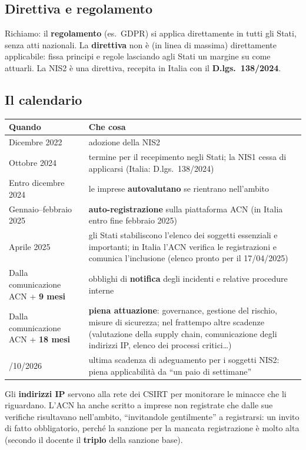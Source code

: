 \subsection{Direttiva e regolamento}
Richiamo: il \textbf{regolamento} (es.\ GDPR) si applica direttamente in tutti gli Stati, senza atti
nazionali. La \textbf{direttiva} non è (in linea di massima) direttamente applicabile: fissa principi e
regole lasciando agli Stati un margine su come attuarli. La NIS2 è una direttiva, recepita in Italia con
il \textbf{D.lgs.~138/2024}.

\subsection{Il calendario}
\begin{center}
\small
\begin{tabularx}{\linewidth}{>{\raggedright\arraybackslash}p{3.4cm} X}
\toprule
\textbf{Quando} & \textbf{Che cosa}\\
\midrule
Dicembre 2022 & adozione della NIS2\\
Ottobre 2024 & termine per il recepimento negli Stati; la NIS1 cessa di applicarsi (Italia:
  D.lgs.~138/2024)\\
Entro dicembre 2024 & le imprese \textbf{autovalutano} se rientrano nell'ambito\\
Gennaio--febbraio 2025 & \textbf{auto-registrazione} sulla piattaforma ACN (in Italia entro fine
  febbraio 2025)\\
Aprile 2025 & gli Stati stabiliscono l'elenco dei soggetti essenziali e importanti; in Italia l'ACN
  verifica le registrazioni e comunica l'inclusione (elenco pronto per il 17/04/2025)\\
Dalla comunicazione ACN + \textbf{9 mesi} & obblighi di \textbf{notifica} degli incidenti e relative
  procedure interne\\
Dalla comunicazione ACN + \textbf{18 mesi} & \textbf{piena attuazione}: governance, gestione del
  rischio, misure di sicurezza; nel frattempo altre scadenze (valutazione della supply chain,
  comunicazione degli indirizzi IP, elenco dei processi critici\ldots)\\
30/10/2026 & ultima scadenza di adeguamento per i soggetti NIS2: piena applicabilità da ``un paio di
  settimane''\\
\bottomrule
\end{tabularx}
\end{center}
Gli \textbf{indirizzi IP} servono alla rete dei CSIRT per monitorare le minacce che li riguardano. L'ACN
ha anche scritto a imprese non registrate che dalle sue verifiche risultavano nell'ambito, ``invitandole
gentilmente'' a registrarsi: un invito di fatto obbligatorio, perché la sanzione per la mancata
registrazione è molto alta (secondo il docente il \textbf{triplo} della sanzione base).

